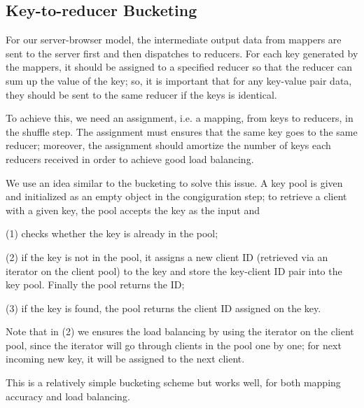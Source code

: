 \subsection{Key-to-reducer Bucketing}

For our server-browser model, the intermediate output data from mappers are sent to the server first and then dispatches to reducers. For each key generated by the mappers, it should be assigned to a specified reducer so that the reducer can sum up the value of the key; so, it is important that for any key-value pair data, they should be sent to the same reducer if the keys is identical.

To achieve this, we need an assignment, i.e. a mapping, from keys to reducers, in the shuffle step. The assignment must ensures that the same key goes to the same reducer; moreover, the assignment should amortize the number of keys each reducers received in order to achieve good load balancing.

We use an idea similar to the bucketing to solve this issue. A key pool is given and initialized as an empty object in the congiguration step; to retrieve a client with a given key, the pool accepts the key as the input and

(1) checks whether the key is already in the pool;

(2) if the key is not in the pool, it assigns a new client ID (retrieved via an iterator on the client pool) to the key and store the key-client ID pair into the key pool. Finally the pool returns the ID;

(3) if the key is found, the pool returns the client ID assigned on the key.

Note that in (2) we ensures the load balancing by using the iterator on the client pool, since the iterator will go through clients in the pool one by one; for next incoming new key, it will be assigned to the next client.

This is a relatively simple bucketing scheme but works well, for both mapping accuracy and load balancing.
